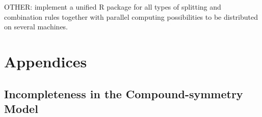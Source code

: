 \documentclass[11pt,a5paper,twoside]{book}
\begin{document}
\begin{table}[ht]
\centering
\caption{Mean (standard deviation) of the estimated for the variance components, fixed effects, and also the number of iterations (Iter) in the converged cases using multiple discarding (with cluster size equal to 5 and 8) and multiple imputation comparing with full data for VC covarianc structure for both random and repeated statements.}
\label{summary_armd_vc}
\end{table}

OTHER: implement a unified R package for all types of splitting and combination rules together with parallel computing possibilities to be distributed on several machines.


\chapter{Appendices}

\backmatter

\appendix
\setcounter{equation}{0}
\renewcommand{\theequation}{A.\arabic{equation}}
\renewcommand{\thesection}{A.\arabic{section}}



\section{Incompleteness in the Compound-symmetry Model} \label{appA}
\end{document}
